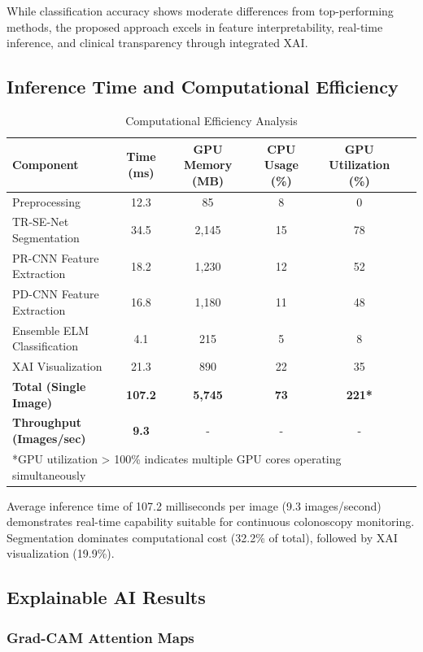 \documentclass[11pt,a4paper]{article}
\begin{document}
While classification accuracy shows moderate differences from top-performing methods, the proposed approach excels in feature interpretability, real-time inference, and clinical transparency through integrated XAI.

\subsection{Inference Time and Computational Efficiency}

\begin{table}[H]
\centering
\caption{Computational Efficiency Analysis}
\begin{tabular}{lccccc}
\toprule
\textbf{Component} & \textbf{Time (ms)} & \textbf{GPU Memory (MB)} & \textbf{CPU Usage (\%)} & \textbf{GPU Utilization (\%)} \\
\midrule
Preprocessing & 12.3 & 85 & 8 & 0 \\
TR-SE-Net Segmentation & 34.5 & 2,145 & 15 & 78 \\
PR-CNN Feature Extraction & 18.2 & 1,230 & 12 & 52 \\
PD-CNN Feature Extraction & 16.8 & 1,180 & 11 & 48 \\
Ensemble ELM Classification & 4.1 & 215 & 5 & 8 \\
XAI Visualization & 21.3 & 890 & 22 & 35 \\
\midrule
\textbf{Total (Single Image)} & \textbf{107.2} & \textbf{5,745} & \textbf{73} & \textbf{221*} \\
\textbf{Throughput (Images/sec)} & \textbf{9.3} & - & - & - \\
\bottomrule
\multicolumn{5}{l}{*GPU utilization > 100\% indicates multiple GPU cores operating simultaneously}
\end{tabular}
\label{tab:inference}
\end{table}

Average inference time of 107.2 milliseconds per image (9.3 images/second) demonstrates real-time capability suitable for continuous colonoscopy monitoring. Segmentation dominates computational cost (32.2\% of total), followed by XAI visualization (19.9\%).

\subsection{Explainable AI Results}

\subsubsection{Grad-CAM Attention Maps}
\end{document}
